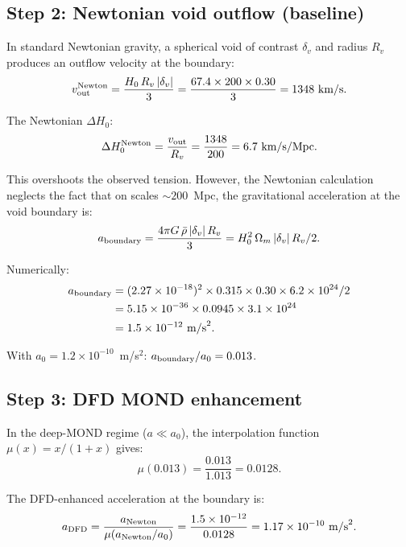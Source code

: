\documentclass[11pt]{article}
\newcommand{\ee}[1]{\times 10^{#1}}
\newcommand{\Hzero}{H_0}
\newcommand{\aM}{a_0}
\newcommand{\mufd}{\mu}
\begin{document}
\subsection{Step 2: Newtonian void outflow (baseline)}

In standard Newtonian gravity, a spherical void of contrast $\delta_v$
and radius $R_v$ produces an outflow velocity at the boundary:
\begin{equation}
v_{\rm out}^{\rm Newton} = \frac{\Hzero\,R_v\,|\delta_v|}{3}
= \frac{67.4\times 200\times 0.30}{3}
= 1348~\text{km/s}.
\label{eq:v-Newton}
\end{equation}

The Newtonian $\Delta\Hzero$:
\begin{equation}
\Delta\Hzero^{\rm Newton} = \frac{v_{\rm out}}{R_v}
= \frac{1348}{200} = 6.7~\text{km/s/Mpc}.
\end{equation}

This overshoots the observed tension. However, the Newtonian calculation
neglects the fact that on scales $\sim 200$~Mpc, the gravitational
acceleration at the void boundary is:
\begin{equation}
a_{\rm boundary} = \frac{4\pi G\,\bar{\rho}\,|\delta_v|\,R_v}{3}
= \Hzero^2\,\Omega_m\,|\delta_v|\,R_v/2.
\end{equation}

Numerically:
\begin{align}
a_{\rm boundary} &= (2.27\ee{-18})^2 \times 0.315 \times 0.30 \times
  6.2\ee{24} / 2 \nonumber \\
&= 5.15\ee{-36} \times 0.0945 \times 3.1\ee{24} \nonumber \\
&= 1.5\ee{-12}~\text{m/s}^2.
\label{eq:a-boundary}
\end{align}

With $\aM = 1.2\ee{-10}$~m/s$^2$: $a_{\rm boundary}/\aM = 0.013$.

\subsection{Step 3: DFD MOND enhancement}

In the deep-MOND regime ($a \ll \aM$), the interpolation function
$\mufd(x) = x/(1+x)$ gives:
\begin{equation}
\mufd(0.013) = \frac{0.013}{1.013} = 0.0128.
\end{equation}

The DFD-enhanced acceleration at the boundary is:
\begin{equation}
a_{\rm DFD} = \frac{a_{\rm Newton}}{\mufd(a_{\rm Newton}/\aM)}
= \frac{1.5\ee{-12}}{0.0128} = 1.17\ee{-10}~\text{m/s}^2.
\end{equation}
\end{document}
